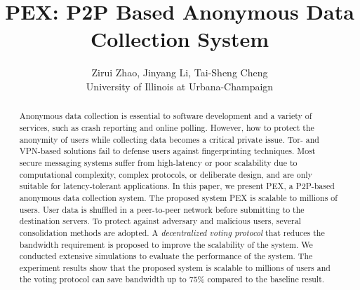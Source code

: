 \documentclass[twocolumn]{article}
\begin{document}
\title{PEX: P2P Based Anonymous Data Collection System}
\author{Zirui Zhao, Jinyang Li, Tai-Sheng Cheng \\ \small University of Illinois at Urbana-Champaign}
\date{}
\maketitle

\begin{abstract}
Anonymous data collection is essential to software development and a variety of services, such as crash reporting and online polling. However, how to protect the anonymity of users while collecting data becomes a critical private issue. Tor- and VPN-based solutions fail to defense users against fingerprinting techniques. Most secure messaging systems suffer from high-latency or poor scalability due to computational complexity, complex protocols, or deliberate design, and are only suitable for latency-tolerant applications. In this paper, we present PEX, a P2P-based anonymous data collection system. The proposed system PEX is scalable to millions of users. User data is shuffled in a peer-to-peer network before submitting to the destination servers. To protect against adversary and malicious users, several consolidation methods are adopted. A \textit{decentralized voting protocol} that reduces the bandwidth requirement is proposed to improve the scalability of the system. We conducted extensive simulations to evaluate the performance of the system. The experiment results show that the proposed system is scalable to millions of users and the voting protocol can save bandwidth up to 75\% compared to the baseline result.
\end{abstract}
\end{document}
